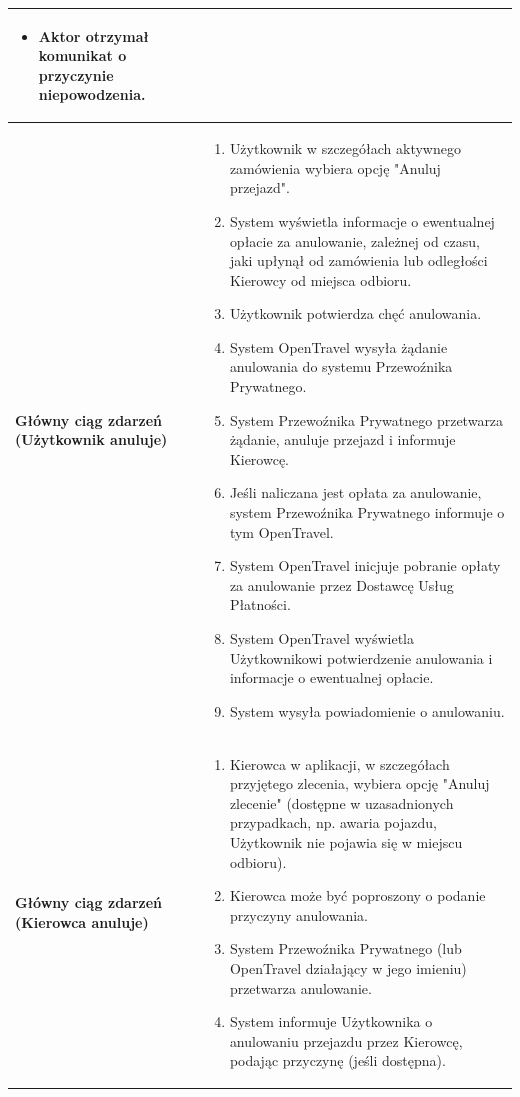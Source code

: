 \documentclass[a4paper,12pt]{article}
\begin{document}
\begin{longtable}{|p{\pierwszakolumnaszerokoscPUTPTAnuluj}|p{\drugakolumnaszerokoscPUTPTAnuluj}|}
\begin{itemize}
            \item Aktor otrzymał komunikat o przyczynie niepowodzenia.
        \end{itemize} \\
    \hline
    \textbf{Główny ciąg zdarzeń (Użytkownik anuluje)} &
        \begin{enumerate} \itemsep0pt \parskip0pt \parsep0pt
            \item Użytkownik w szczegółach aktywnego zamówienia wybiera opcję "Anuluj przejazd".
            \item System wyświetla informacje o ewentualnej opłacie za anulowanie, zależnej od czasu, jaki upłynął od zamówienia lub odległości Kierowcy od miejsca odbioru.
            \item Użytkownik potwierdza chęć anulowania.
            \item System OpenTravel wysyła żądanie anulowania do systemu Przewoźnika Prywatnego.
            \item System Przewoźnika Prywatnego przetwarza żądanie, anuluje przejazd i informuje Kierowcę.
            \item Jeśli naliczana jest opłata za anulowanie, system Przewoźnika Prywatnego informuje o tym OpenTravel.
            \item System OpenTravel inicjuje pobranie opłaty za anulowanie przez Dostawcę Usług Płatności.
            \item System OpenTravel wyświetla Użytkownikowi potwierdzenie anulowania i informacje o ewentualnej opłacie.
            \item System wysyła powiadomienie o anulowaniu.
        \end{enumerate} \\
    \hline
     \textbf{Główny ciąg zdarzeń (Kierowca anuluje)} &
        \begin{enumerate} \itemsep0pt \parskip0pt \parsep0pt
            \item Kierowca w aplikacji, w szczegółach przyjętego zlecenia, wybiera opcję "Anuluj zlecenie" (dostępne w uzasadnionych przypadkach, np. awaria pojazdu, Użytkownik nie pojawia się w miejscu odbioru).
            \item Kierowca może być poproszony o podanie przyczyny anulowania.
            \item System Przewoźnika Prywatnego (lub OpenTravel działający w jego imieniu) przetwarza anulowanie.
            \item System informuje Użytkownika o anulowaniu przejazdu przez Kierowcę, podając przyczynę (jeśli dostępna).

\end{enumerate}
\end{longtable}
\end{document}
